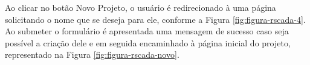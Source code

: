     	\begin{figure}[!h]
    	\end{figure}
    	
Ao clicar no botão Novo Projeto, o usuário é redirecionado à uma página solicitando o nome que se deseja para ele, conforme a Figura \ref{fig:figura-rscada-4}. Ao submeter o formulário é apresentada uma mensagem de sucesso caso seja possível a criação dele e em seguida encaminhado à página inicial do projeto, representado na Figura \ref{fig:figura-rscada-novo}. 

        \begin{figure}[!h]
    	\end{figure}
    	
    	\begin{figure}[!h]
    	\end{figure}

